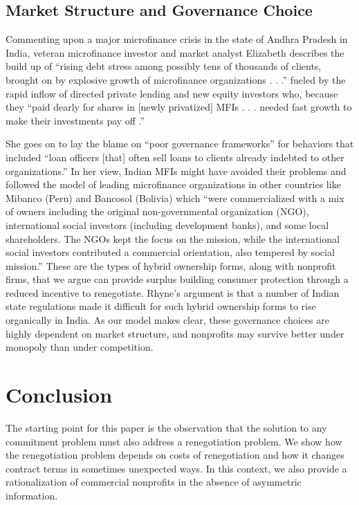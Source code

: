 \documentclass[11pt,english]{article}
\theoremstyle{plain}
\theoremstyle{definition}
\begin{document}
\subsection{Market Structure and Governance Choice}

Commenting upon a major microfinance crisis in the state of Andhra
Pradesh in India, veteran microfinance investor and market analyst
Elizabeth \citet{rhyne2011} describes the build up of ``rising debt
stress among possibly tens of thousands of clients, brought on by
explosive growth of microfinance organizations . . .\textquotedblright{}
fueled by the rapid inflow of directed private lending and new equity
investors who, because they ``paid dearly for shares in {[}newly
privatized{]} MFIs . . . needed fast growth to make their investments
pay off .\textquotedblright{}

She goes on to lay the blame on ``poor governance frameworks\textquotedblright{}
for behaviors that included ``loan officers {[}that{]} often sell
loans to clients already indebted to other organizations.'' In her
view, Indian MFIs might have avoided their problems and followed the
model of leading microfinance organizations in other countries like
Mibanco (Peru) and Bancosol (Bolivia) which ``were commercialized
with a mix of owners including the original non-governmental organization
(NGO), international social investors (including development banks),
and some local shareholders. The NGOs kept the focus on the mission,
while the international social investors contributed a commercial
orientation, also tempered by social mission.'' These are the types
of hybrid ownership forms, along with nonprofit firms, that we argue
can provide surplus building consumer protection through a reduced
incentive to renegotiate. Rhyne's argument is that a number of Indian
state regulations made it difficult for such hybrid ownership forms
to rise organically in India. As our model makes clear, these governance
choices are highly dependent on market structure, and nonprofits may
survive better under monopoly than under competition.

\section{Conclusion}

The starting point for this paper is the observation that the solution
to any commitment problem must also address a renegotiation problem.
We show how the renegotiation problem depends on costs of renegotiation
and how it changes contract terms in sometimes unexpected ways. In
this context, we also provide a rationalization of commercial nonprofits
in the absence of asymmetric information.
\end{document}
